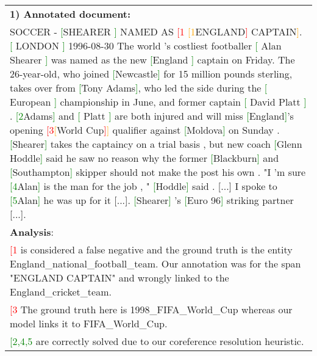 \documentclass[11pt,a4paper]{article}
\newcommand{\redc}[1] {\textcolor{red}{#1}}
\newcommand{\greenc}[1] {\textcolor{green}{#1}}
\newcommand{\orangec}[1] {\textcolor{orange}{#1}}
\begin{document}
\begin{table*}[!h]
\centering
\begin{tabular}{p{15.5cm}} 
\hline
\textbf{1) Annotated document:} \\
SOCCER - \greenc{[}SHEARER \greenc{]} NAMED AS \redc{[1} \orangec{[1}ENGLAND\redc{]}  CAPTAIN\orangec{]}. \greenc{[} LONDON \greenc{]} 1996-08-30 The world 's costliest footballer \greenc{[} Alan Shearer \greenc{]} was named as the new \greenc{[}England \greenc{]} captain on Friday. The 26-year-old, who joined \greenc{[}Newcastle\greenc{]} for 15 million pounds sterling, takes over from \greenc{[}Tony Adams\greenc{]}, who led the side during the \greenc{[} European \greenc{]} championship in June, and former captain \greenc{[} David Platt \greenc{]} . \greenc{[2}Adams\greenc{]} and \greenc{[} Platt \greenc{]} are both injured and will miss \greenc{[}England\greenc{]}'s opening \redc{[3}\orangec{[}World Cup\redc{]}\orangec{]} qualifier against \greenc{[}Moldova\greenc{]} on Sunday . \greenc{[}Shearer\greenc{]} takes the captaincy on a trial basis , but new coach \greenc{[}Glenn Hoddle\greenc{]} said he saw no reason why the former \greenc{[}Blackburn\greenc{]} and \greenc{[}Southampton\greenc{]} skipper should not make the post his own . "I 'm sure \greenc{[4}Alan\greenc{]} is the man for the job , " \greenc{[}Hoddle\greenc{]} said . [...] I spoke to \greenc{[5}Alan\greenc{]} he was up for it [...]. \greenc{[}Shearer\greenc{]} 's \greenc{[}Euro 96\greenc{]} striking partner [...]. \\
\hline
\textbf{Analysis}:\\
\redc{[1} is considered a false negative and the ground truth is the entity England\_national\_football\_team. Our annotation was for the span "ENGLAND CAPTAIN" and wrongly linked to the England\_cricket\_team. \\
\redc{[3} The ground truth here is 1998\_FIFA\_World\_Cup whereas our model links it to FIFA\_World\_Cup.\\
\greenc{[2,4,5} are correctly solved due to our coreference resolution heuristic. \\
\hline


\end{tabular}
\end{table*}
\end{document}
